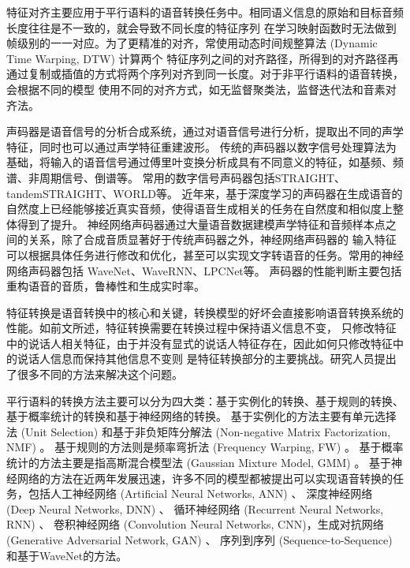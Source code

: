 特征对齐主要应用于平行语料的语音转换任务中。相同语义信息的原始和目标音频长度往往是不一致的，就会导致不同长度的特征序列
在学习映射函数时无法做到帧级别的一一对应。为了更精准的对齐，常使用动态时间规整算法 (Dynamic Time Warping, DTW) 计算两个
特征序列之间的对齐路径，所得到的对齐路径再通过复制或插值的方式将两个序列对齐到同一长度。对于非平行语料的语音转换，会根据不同的模型
使用不同的对齐方式，如无监督聚类法\cite{sundermann2003vtln}，监督迭代法\cite{erro2009inca}和音素对齐法\cite{ye2004voice}。

声码器是语音信号的分析合成系统，通过对语音信号进行分析，提取出不同的声学特征，同时也可以通过声学特征重建波形。
传统的声码器以数字信号处理算法为基础，将输入的语音信号通过傅里叶变换分析成具有不同意义的特征，如基频、频谱、非周期信号、倒谱等。
常用的数字信号声码器包括STRAIGHT\cite{kawahara1997speech}、tandemSTRAIGHT\cite{kawahara2008tandem}、WORLD\cite{morise2016world}等。
近年来，基于深度学习的声码器在生成语音的自然度上已经能够接近真实音频，使得语音生成相关的任务在自然度和相似度上整体得到了提升。
神经网络声码器通过大量语音数据建模声学特征和音频样本点之间的关系，除了合成音质显著好于传统声码器之外，神经网络声码器的
输入特征可以根据具体任务进行修改和优化，甚至可以实现文字转语音的任务。常用的神经网络声码器包括
WaveNet\cite{oord2016wavenet,tamamori2017speaker,oord2017parallel}、WaveRNN\cite{kalchbrenner2018efficient}、LPCNet\cite{valin2019lpcnet}等。
声码器的性能判断主要包括重构语音的音质，鲁棒性和生成实时率。

特征转换是语音转换中的核心和关键，转换模型的好坏会直接影响语音转换系统的性能。如前文所述，特征转换需要在转换过程中保持语义信息不变，
只修改特征中的说话人相关特征，由于并没有显式的说话人特征存在，因此如何只修改特征中的说话人信息而保持其他信息不变则
是特征转换部分的主要挑战。研究人员提出了很多不同的方法来解决这个问题。

平行语料的转换方法主要可以分为四大类：基于实例化的转换、基于规则的转换、基于概率统计的转换和基于神经网络的转换。
基于实例化的方法主要有单元选择法 (Unit Selection)\cite{shuang2008voice,sundermann2006text,wu2013exemplar} 
和基于非负矩阵分解法 (Non-negative Matrix Factorization, NMF)\cite{takashima2012exemplar,wu2014exemplar,zhang2015regularized} 。
基于规则的方法则是频率弯折法 (Frequency Warping, FW)\cite{shuang2008voice,erro2009voice,tian2015sparse,Toda2001Voice} 。
基于概率统计的方法主要是指高斯混合模型法 (Gaussian Mixture Model, GMM)\cite{chen2003voice,kain1998spectral,kobayashi2016nu,stylianou1998continuous} 。
基于神经网络的方法在近两年发展迅速，许多不同的模型都被提出可以实现语音转换的任务，包括人工神经网络 (Artificial Neural Networks, ANN)\cite{desai2010spectral} 、
深度神经网络 (Deep Neural Networks, DNN)\cite{aryal2015articulatory,chen2014voice} 、
循环神经网络 (Recurrent Neural Networks, RNN)\cite{nakashika2015voice,sun2015voice} 、
卷积神经网络 (Convolution Neural Networks, CNN)\cite{kaneko2017sequence}，生成对抗网络(Generative Adversarial Network, GAN)\cite{hsu2017voice,kaneko2017sequence} 、
序列到序列 (Sequence-to-Sequence)\cite{kameoka2018convs2s,tanaka2019atts2s,zhang2019improving} 
和基于WaveNet的方法\cite{polyak2019attention}。

